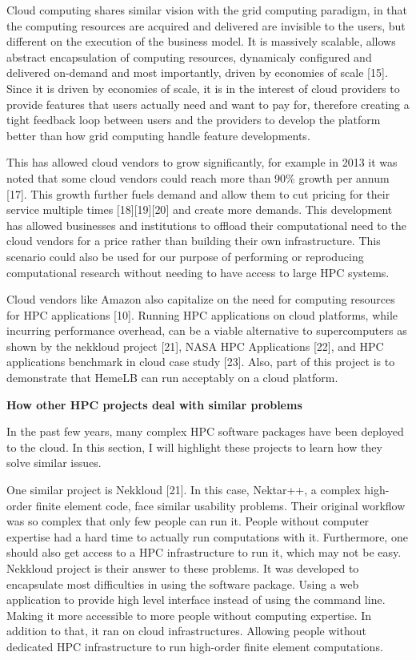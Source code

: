 \documentclass[]{article}
\begin{document}
Cloud computing shares similar vision with the grid computing paradigm,
in that the computing resources are acquired and delivered are invisible
to the users, but different on the execution of the business model. It
is massively scalable, allows abstract encapsulation of computing
resources, dynamicaly configured and delivered on-demand and most
importantly, driven by economies of scale {[}15{]}. Since it is driven
by economies of scale, it is in the interest of cloud providers to
provide features that users actually need and want to pay for, therefore
creating a tight feedback loop between users and the providers to
develop the platform better than how grid computing handle feature
developments.

This has allowed cloud vendors to grow significantly, for example in
2013 it was noted that some cloud vendors could reach more than 90\%
growth per annum {[}17{]}. This growth further fuels demand and allow
them to cut pricing for their service multiple times
{[}18{]}{[}19{]}{[}20{]} and create more demands. This development has
allowed businesses and institutions to offload their computational need
to the cloud vendors for a price rather than building their own
infrastructure. This scenario could also be used for our purpose of
performing or reproducing computational research without needing to have
access to large HPC systems.

Cloud vendors like Amazon also capitalize on the need for computing
resources for HPC applications {[}10{]}. Running HPC applications on
cloud platforms, while incurring performance overhead, can be a viable
alternative to supercomputers as shown by the nekkloud project {[}21{]},
NASA HPC Applications {[}22{]}, and HPC applications benchmark in cloud
case study {[}23{]}. Also, part of this project is to demonstrate that
HemeLB can run acceptably on a cloud platform.

\textbf{How other HPC projects deal with similar problems}

In the past few years, many complex HPC software packages have been
deployed to the cloud. In this section, I will highlight these projects
to learn how they solve similar issues.

One similar project is Nekkloud {[}21{]}. In this case, Nektar++, a
complex high-order finite element code, face similar usability problems.
Their original workflow was so complex that only few people can run it.
People without computer expertise had a hard time to actually run
computations with it. Furthermore, one should also get access to a HPC
infrastructure to run it, which may not be easy. Nekkloud project is
their answer to these problems. It was developed to encapsulate most
difficulties in using the software package. Using a web application to
provide high level interface instead of using the command line. Making
it more accessible to more people without computing expertise. In
addition to that, it ran on cloud infrastructures. Allowing people
without dedicated HPC infrastructure to run high-order finite element
computations.
\end{document}
